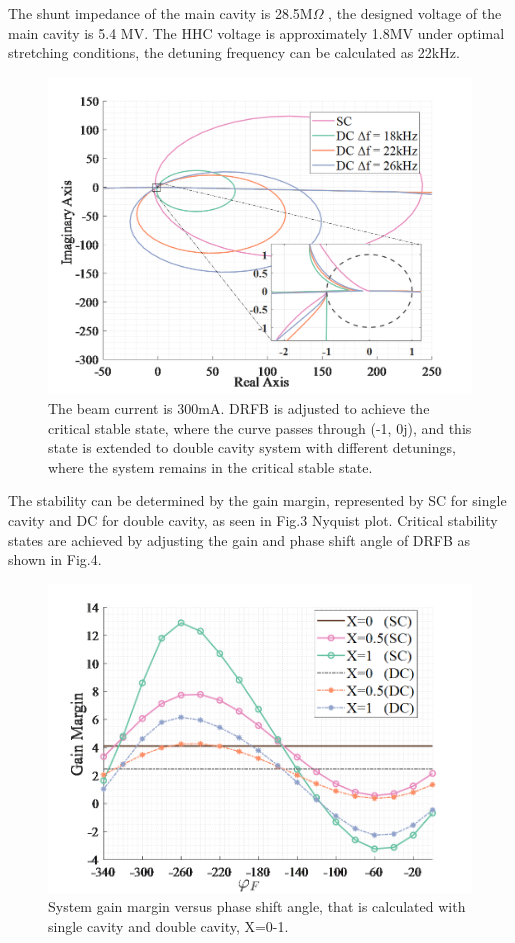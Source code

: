 \documentclass[letterpaper,
               nospread,     %
               ]{jacow}
\begin{document}
The shunt impedance of the main cavity is 28.5M$\Omega $ , the designed voltage of the main cavity is 5.4 MV. The HHC voltage is approximately 1.8MV under optimal stretching conditions, the detuning frequency can be calculated as 22kHz.
\begin{figure}[!htb]
   \centering
   \includegraphics*[width=0.7\columnwidth]{THPA037_f3}
   \caption{The beam current is 300mA. DRFB is adjusted to achieve the critical stable state, where the curve passes through (-1, 0j), and this state is extended to double cavity system with different detunings, where the system remains in the critical stable state.}
   \label{fig:paper_layout}
\end{figure}
The stability can be determined by the gain margin, represented by SC for single cavity and DC for double cavity, as seen in Fig.3 Nyquist plot. Critical stability states are achieved by adjusting the gain and phase shift angle of DRFB as shown in Fig.4.
\begin{figure}[!htb]
   \centering
   \includegraphics*[width=0.7\columnwidth]{THPA037_f4}
   \caption{System gain margin versus phase shift angle, that is calculated with single cavity and double cavity, X=0-1.}
   \label{fig:paper_layout}
\end{figure}
\end{document}
